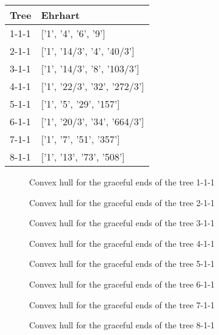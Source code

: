 \documentclass{article}
\begin{document}
\begin{center}
              \begin{tabular}{| l | l |}
              \hline
              Tree & Ehrhart\\ 
              \hline 
1-1-1 & ['1', '4', '6', '9']\\ 
\hline
2-1-1 & ['1', '14/3', '4', '40/3']\\ 
\hline
3-1-1 & ['1', '14/3', '8', '103/3']\\ 
\hline
4-1-1 & ['1', '22/3', '32', '272/3']\\ 
\hline
5-1-1 & ['1', '5', '29', '157']\\ 
\hline
6-1-1 & ['1', '20/3', '34', '664/3']\\ 
\hline
7-1-1 & ['1', '7', '51', '357']\\ 
\hline
8-1-1 & ['1', '13', '73', '508']\\ 
\hline
\hline
              \end{tabular}
              \end{center}\begin{figure}[H]
	\center
	
                \caption{Convex hull for the graceful ends of the tree 1-1-1}
\end{figure}
\begin{figure}[H]
	\center
	
                \caption{Convex hull for the graceful ends of the tree 2-1-1}
\end{figure}
\begin{figure}[H]
	\center
	
                \caption{Convex hull for the graceful ends of the tree 3-1-1}
\end{figure}
\begin{figure}[H]
	\center
	
                \caption{Convex hull for the graceful ends of the tree 4-1-1}
\end{figure}
\begin{figure}[H]
	\center
	
                \caption{Convex hull for the graceful ends of the tree 5-1-1}
\end{figure}
\begin{figure}[H]
	\center
	
                \caption{Convex hull for the graceful ends of the tree 6-1-1}
\end{figure}
\begin{figure}[H]
	\center
	
                \caption{Convex hull for the graceful ends of the tree 7-1-1}
\end{figure}
\begin{figure}[H]
	\center
	
                \caption{Convex hull for the graceful ends of the tree 8-1-1}
\end{figure}
\end{document}
